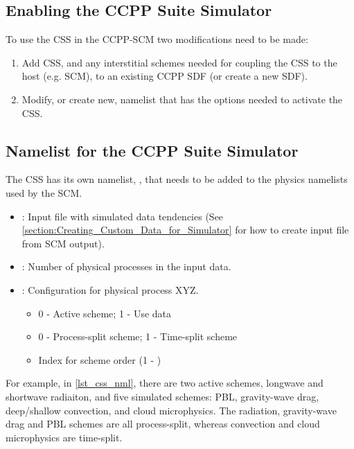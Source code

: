 \subsection{Enabling the CCPP Suite Simulator}

To use the CSS in the CCPP-SCM two modifications need to be made:

\begin{enumerate}
\item Add CSS, and any interstitial schemes needed for coupling the CSS to the host (e.g. SCM), to an existing CCPP SDF (or create a new SDF).
\item Modify, or create new, namelist that has the options needed to activate the CSS.
\end{enumerate}

\subsection{Namelist for the CCPP Suite Simulator}

The CSS has its own namelist, , that needs to be added to the physics namelists used by the SCM.



\begin{itemize}
\item {}: Input file with simulated data tendencies (See \ref{section:Creating_Custom_Data_for_Simulator} for how to create input file from SCM output).
\item {}: Number of physical processes in the input data.
\item {}: Configuration for physical process XYZ.
\begin{itemize}
\item 0 - Active scheme; 1 - Use data
\item 0 - Process-split scheme; 1 - Time-split scheme
\item Index for scheme order (1 - )
\end{itemize}
\end{itemize}

For example, in \ref{lst_css_nml}, there are two active schemes, longwave and shortwave radiaiton, and five simulated schemes: PBL, gravity-wave drag, deep/shallow convection, and cloud microphysics. The radiation, gravity-wave drag and PBL schemes are all process-split, whereas convection and cloud microphysics are time-split. 


